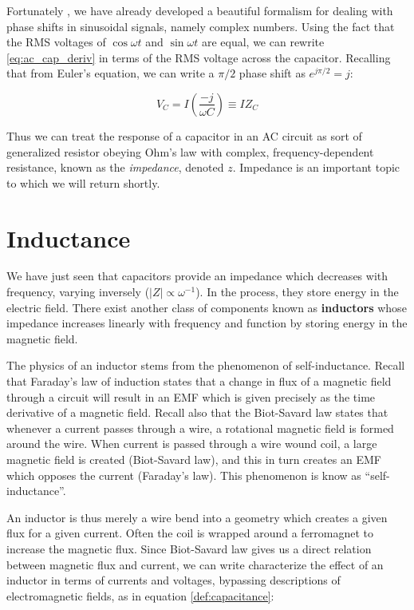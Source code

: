\documentclass{tufte-book}
\begin{document}
Fortunately , we have already developed a beautiful formalism for dealing with phase shifts in sinusoidal signals, namely complex numbers. Using the fact that the RMS voltages of $\cos\omega t$ and $\sin\omega t$ are equal, we can rewrite \ref{eq:ac_cap_deriv} in terms of the RMS voltage across the capacitor. Recalling that from Euler's equation, we can write a $\pi/2$ phase shift as $e^{j\pi/2} = j$:

\begin{equation}\label{eq:cap_impedance}
V_C = I\left(\frac{-j}{\omega C}\right) \equiv IZ_C
\end{equation}

Thus we can treat the response of a capacitor in an AC circuit as sort of generalized resistor obeying Ohm's law with complex, frequency-dependent resistance, known as the \textit{impedance}, denoted $z$. Impedance is an important topic to which we will return shortly.

\section{Inductance}
We have just seen that capacitors provide an impedance which decreases with frequency, varying inversely ($\vert Z \vert \propto \omega^{-1}$). In the process, they store energy in the electric field. There exist another class of components known as \textbf{inductors} whose impedance increases linearly with frequency and function by storing energy in the magnetic field.

The physics of an inductor stems from the phenomenon of self-inductance. Recall that Faraday's law of induction states that a change in flux of a magnetic field through a circuit will result in an EMF which is given precisely as the time derivative of a magnetic field. Recall also that the Biot-Savard law states that whenever a current passes through a wire, a rotational magnetic field is formed around the wire. When current is passed through a wire wound coil, a large magnetic field is created (Biot-Savard law), and this in turn creates an EMF which opposes the current (Faraday's law). This phenomenon is know as ``self-inductance''.

An inductor is thus merely a wire bend into a geometry which creates a given flux for a given current. Often the coil is wrapped around a ferromagnet to increase the magnetic flux. Since Biot-Savard law gives us a direct relation between magnetic flux and current, we can write characterize the effect of an inductor in terms of currents and voltages, bypassing descriptions of electromagnetic fields, as in equation \ref{def:capacitance}:
\end{document}
